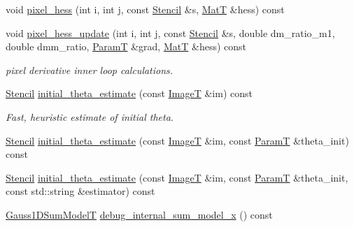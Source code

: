 \begin{DoxyCompactItemize}
\item 
void \hyperlink{classmappel_1_1Gauss2DsModel_a4f80f81e88e02ce3be7c6e5052236ae2}{pixel\+\_\+hess} (int i, int j, const \hyperlink{classmappel_1_1Gauss2DsModel_1_1Stencil}{Stencil} \&s, \hyperlink{namespacemappel_a7091ab87c528041f7e2027195fad8915}{MatT} \&hess) const 
\item 
void \hyperlink{classmappel_1_1Gauss2DsModel_abc9ec137a0cf5238a34b9c041e3fc3a5}{pixel\+\_\+hess\+\_\+update} (int i, int j, const \hyperlink{classmappel_1_1Gauss2DsModel_1_1Stencil}{Stencil} \&s, double dm\+\_\+ratio\+\_\+m1, double dmm\+\_\+ratio, \hyperlink{classmappel_1_1PointEmitterModel_a665ec6aea3aac139bb69a23c06d4b9a1}{ParamT} \&grad, \hyperlink{namespacemappel_a7091ab87c528041f7e2027195fad8915}{MatT} \&hess) const 
\begin{DoxyCompactList}\small\item\em pixel derivative inner loop calculations. \end{DoxyCompactList}\item 
\hyperlink{classmappel_1_1Gauss2DsModel_1_1Stencil}{Stencil} \hyperlink{classmappel_1_1Gauss2DsModel_a161d46578c6796a7ac669ec8971e89e1}{initial\+\_\+theta\+\_\+estimate} (const \hyperlink{classmappel_1_1ImageFormat2DBase_a667ea5016648958e507e7db8eaa041b0}{ImageT} \&im) const 
\begin{DoxyCompactList}\small\item\em Fast, heuristic estimate of initial theta. \end{DoxyCompactList}\item 
\hyperlink{classmappel_1_1Gauss2DsModel_1_1Stencil}{Stencil} \hyperlink{classmappel_1_1Gauss2DsModel_a20678f6114e65815916aa53937ee5d80}{initial\+\_\+theta\+\_\+estimate} (const \hyperlink{classmappel_1_1ImageFormat2DBase_a667ea5016648958e507e7db8eaa041b0}{ImageT} \&im, const \hyperlink{classmappel_1_1PointEmitterModel_a665ec6aea3aac139bb69a23c06d4b9a1}{ParamT} \&theta\+\_\+init) const 
\item 
\hyperlink{classmappel_1_1Gauss2DsModel_1_1Stencil}{Stencil} \hyperlink{classmappel_1_1Gauss2DsModel_ab268b65a61ef6879b72daf20419ad0cd}{initial\+\_\+theta\+\_\+estimate} (const \hyperlink{classmappel_1_1ImageFormat2DBase_a667ea5016648958e507e7db8eaa041b0}{ImageT} \&im, const \hyperlink{classmappel_1_1PointEmitterModel_a665ec6aea3aac139bb69a23c06d4b9a1}{ParamT} \&theta\+\_\+init, const std\+::string \&estimator) const 
\item 
\hyperlink{classmappel_1_1Gauss2DsModel_a23ae68443a62f76405e6f08f6dec4fb7}{Gauss1\+D\+Sum\+ModelT} \hyperlink{classmappel_1_1Gauss2DsModel_a94ce8fb5e93ba7607f75090e1fe9fe7e}{debug\+\_\+internal\+\_\+sum\+\_\+model\+\_\+x} () const 

\end{DoxyCompactItemize}
